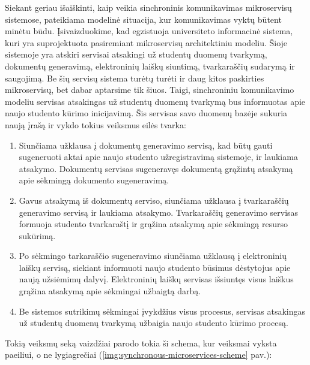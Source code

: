 Siekant geriau išaiškinti, kaip veikia sinchroninis komunikavimas mikroservisų sistemose, pateikiama modelinė situacija, kur komunikavimas vyktų būtent
minėtu būdu. Įsivaizduokime, kad egzistuoja universiteto informacinė sistema, kuri yra suprojektuota pasiremiant mikroservisų
architektiniu modeliu. Šioje sistemoje yra atskiri servisai atsakingi už studentų duomenų tvarkymą, dokumentų generavimą, elektroninių laiškų siuntimą, tvarkaraščių sudarymą 
ir saugojimą. Be šių servisų sistema turėtų turėti ir daug kitos paskirties mikroservisų, bet dabar aptarsime tik šiuos.
Taigi, sinchroniniu komunikavimo modeliu servisas atsakingas už studentų duomenų tvarkymą bus informuotas apie naujo studento kūrimo inicijavimą.
Šis servisas savo duomenų bazėje sukuria naują įrašą ir vykdo tokius veiksmus eilės tvarka:

\begin{enumerate}
  \item Siunčiama užklausa į dokumentų generavimo servisą, kad būtų gauti sugeneruoti aktai apie naujo studento užregistravimą sistemoje, ir laukiama atsakymo. Dokumentų servisas sugeneravęs dokumentą grąžintų atsakymą apie sėkmingą
  dokumento sugeneravimą.
	\item Gavus atsakymą iš dokumentų serviso, siunčiama užklausa į tvarkaraščių generavimo servisą ir laukiama atsakymo. Tvarkaraščių generavimo servisas formuoja studento tvarkaraštį ir grąžina atsakymą apie sėkmingą resurso sukūrimą.
	\item Po sėkmingo tarkaraščio sugeneravimo siunčiama užklausą į elektroninių laiškų servisą, siekiant informuoti naujo studento būsimus dėstytojus apie
  naują užsiėmimų dalyvį. Elektroninių laiškų servisas išsiuntęs visus laiškus grąžina atsakymą apie sėkmingai užbaigtą darbą.
  \item Be sistemos sutrikimų sėkmingai įvykdžius visus procesus, servisas atsakingas už studentų duomenų tvarkymą užbaigia naujo studento kūrimo procesą.
\end{enumerate}

Tokią veiksmų seką vaizdžiai parodo tokia ši schema, kur veiksmai vyksta paeiliui, o ne lygiagrečiai (\ref{img:synchronous-microservices-scheme} pav.):

